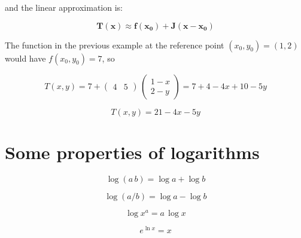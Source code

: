 \documentclass[12pt]{article}
\begin{document}
and the linear approximation is:

\begin{equation}
	\label{TaylorLin_nvar}
	\mathbf{T(x)} \approx  \mathbf{f(x_0)} + \mathbf{J} \left( \mathbf{x} - \mathbf{x_0}\right)
\end{equation}

The function in the previous example at the reference point $(x_0, y_0)=(1,2)$ would have $f(x_0, y_0)=7$, so


\begin{equation}
	T(x,y) = 7 + \begin{pmatrix} 4 & 5 \end{pmatrix} \, \begin{pmatrix} 1-x \\ 2-y \end{pmatrix} = 7 +  4- 4 x + 10-5 y  \nonumber
\end{equation}

\begin{equation}
	T(x,y) = 21 - 4 x - 5 y  \nonumber
\end{equation}

\FloatBarrier

\section{Some properties of logarithms}
\label{logprop}
\begin{equation}
 \log{(a \, b)} =	\log{a} + \log{b} 
\end{equation}

\begin{equation}
	\log{(a / b)} =	\log{a} - \log{b} 
\end{equation}

\begin{equation}
	\log{x^a} =a \, \log{x} 
\end{equation}

\begin{equation}
	e^{\ln{x}} = x 
\end{equation}
\end{document}
